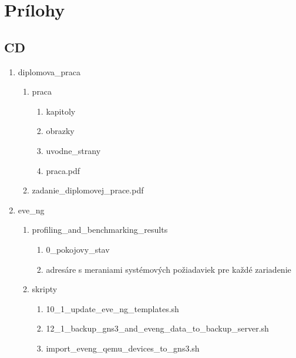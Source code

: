 \chapter{Prílohy}
\label{chap:prilohy}





\section{CD}
\label{chap:cd}


\begin{enumerate}[noitemsep,label*=\thesection.\arabic*.]
    \item diplomova\_praca
    
    \begin{enumerate}[noitemsep,label*=\arabic*.]
        \item praca
        
        \begin{enumerate}[noitemsep,label*=\arabic*.]
            \item kapitoly
            \item obrazky
            \item uvodne\_strany
            \item praca.pdf
        \end{enumerate}
        
        \item zadanie\_diplomovej\_prace.pdf
    \end{enumerate}
    
    \item \label{item:prilohy_cd_eve_ng_adresar} eve\_ng
    
    \begin{enumerate}[noitemsep,label*=\arabic*.]
        \item profiling\_and\_benchmarking\_results
        
        \begin{enumerate}[noitemsep,label*=\arabic*.]
            \item 0\_pokojovy\_stav
            \item \label{item:all_benchmarks} adresáre s meraniami systémových požiadaviek pre každé zariadenie
        \end{enumerate}
        
        \item \label{item:skripty} skripty
        
        \begin{enumerate}[noitemsep,label*=\arabic*.]
            \item \label{item:uprava_sablon_skript} 10\_1\_update\_eve\_ng\_templates.sh
            \item \label{item:backup_script} 12\_1\_backup\_gns3\_and\_eveng\_data\_to\_backup\_server.sh
            \item \label{item:gns3_import_skript} import\_eveng\_qemu\_devices\_to\_gns3.sh
        \end{enumerate}
        

\end{enumerate}
\end{enumerate}
